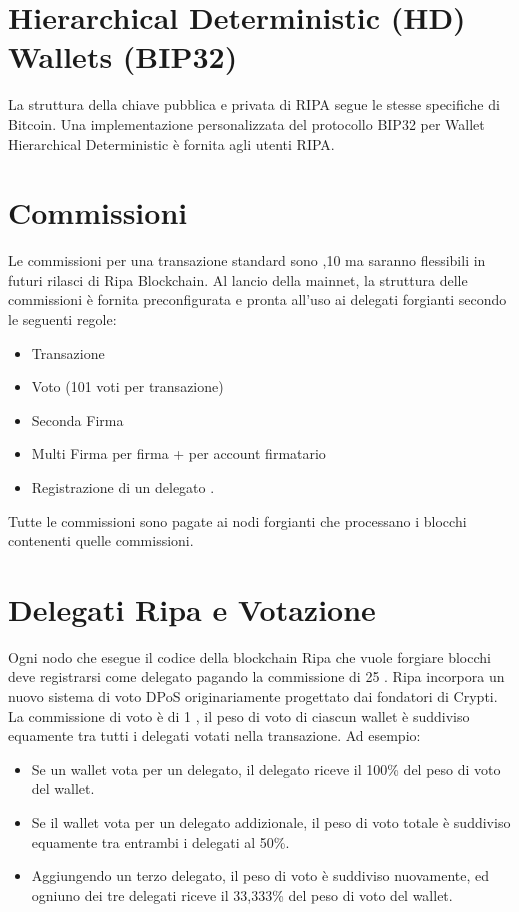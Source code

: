 \documentclass[11pt,fleqn]{book} %
\begin{document}
\section{Hierarchical Deterministic (HD) Wallets (BIP32)}
La struttura della chiave pubblica e privata di RIPA segue le stesse specifiche di Bitcoin. Una implementazione
personalizzata del protocollo BIP32 per Wallet Hierarchical Deterministic è fornita agli utenti RIPA.

\section{Commissioni}
Le commissioni per una transazione standard sono ,10 ma saranno flessibili in futuri rilasci di Ripa Blockchain.
Al lancio della mainnet, la struttura delle commissioni è fornita preconfigurata e pronta all'uso ai delegati
forgianti secondo le seguenti regole:
	\begin{itemize}
		\item Transazione 
		\item Voto  (101 voti per transazione)
		\item Seconda Firma 
		\item Multi Firma  per firma +  per account firmatario
		\item Registrazione di un delegato .
	\end{itemize}
Tutte le commissioni sono pagate ai nodi forgianti che processano i blocchi contenenti quelle commissioni.

\section{Delegati Ripa e Votazione}
Ogni nodo che esegue il codice della blockchain Ripa che vuole forgiare blocchi deve registrarsi come 
delegato pagando la commissione di 25 \PHP. Ripa incorpora un nuovo sistema di voto DPoS
originariamente progettato dai fondatori di Crypti. La commissione di voto è di 1 \PHP, 
il peso di voto di ciascun wallet è suddiviso equamente tra tutti i delegati votati 
nella transazione. Ad esempio: 
\begin{itemize}
	\item Se un wallet vota per un delegato, il delegato riceve il 100\% del peso di voto del
	wallet.
	\item Se il wallet vota per un delegato addizionale, il peso di voto totale è 
	suddiviso equamente tra entrambi i delegati al 50\%.
	\item Aggiungendo un terzo delegato, il peso di voto è suddiviso nuovamente, 
	ed ogniuno dei tre delegati riceve il 33,333\% del peso di voto del wallet.
\end{itemize}
\end{document}
